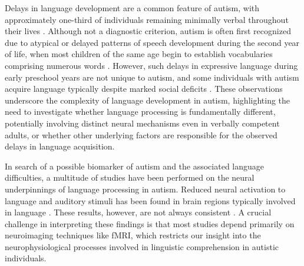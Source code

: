 Delays in language development are a common feature of autism, with approximately one-third of individuals remaining minimally verbal throughout their lives \citep{apa2013,kim2014,velikonja2019}. Although not a diagnostic criterion, autism is often first recognized due to atypical or delayed patterns of speech development during the second year of life, when most children of the same age begin to establish vocabularies comprising numerous words \citep{short1988}. However, such delays in expressive language during early preschool years are not unique to autism, and some individuals with autism acquire language typically despite marked social deficits \citep{anderson2007}. These observations underscore the complexity of language development in autism, highlighting the need to investigate whether language processing is fundamentally different, potentially involving distinct neural mechanisms even in verbally competent adults, or whether other underlying factors are responsible for the observed delays in language acquisition.

In search of a possible biomarker of autism and the associated language difficulties, a multitude of studies have been performed on the neural underpinnings of language processing in autism. Reduced neural activation to language and auditory stimuli has been found in brain regions typically involved in language \citep[for reviews]{groen2008,philip2012}. These results, however, are not always consistent \citep{tryfon2018}. A crucial challenge in interpreting these findings is that most studies depend primarily on neuroimaging techniques like fMRI, which restricts our insight into the neurophysiological processes involved in linguistic comprehension in autistic individuals. 


